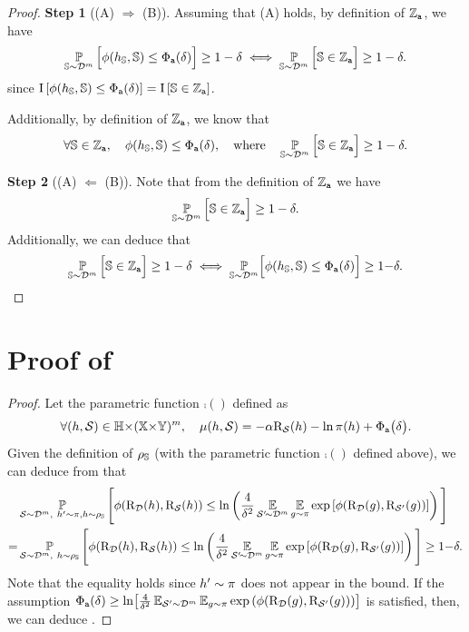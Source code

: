 \begin{noaddcontents}
\begin{proof}
\textbf{Step 1} ((A) $\Rightarrow$ (B)).
Assuming that (A) holds, by definition of $\mathbb{Z}_{{\tt a}}$, we have
\begin{align*}
    \operatorname*{\mathbb{P}}_{\mathbb{S}\sim\mathcal{D}^m}\Big[ \phi(h_{\mathbb{S}}, \mathbb{S}) \le \Phi_{{\tt a}}(\delta) \Big] \ge 1-\delta \iff \operatorname*{\mathbb{P}}_{\mathbb{S}\sim\mathcal{D}^m}\Big[ \mathbb{S}\in\mathbb{Z}_{{\tt a}} \Big] \ge 1-\delta.
\end{align*}
since $\operatorname{I}\left[ \phi(h_{\mathbb{S}}, \mathbb{S}) \le \Phi_{{\tt a}}(\delta) \right] = \operatorname{I}\left[ \mathbb{S}\in\mathbb{Z}_{{\tt a}} \right]$.

Additionally, by definition of $\mathbb{Z}_{{\tt a}}$, we know that
\begin{align*}
    \forall\mathbb{S}\in\mathbb{Z}_{{\tt a}},\quad  \phi(h_{\mathbb{S}}, \mathbb{S}) \le \Phi_{{\tt a}}(\delta), \quad\text{where}\quad \operatorname*{\mathbb{P}}_{\mathbb{S}\sim\mathcal{D}^m}\Big[ \mathbb{S}\in\mathbb{Z}_{{\tt a}} \Big] \ge 1-\delta.
\end{align*}

\textbf{Step 2} ((A) $\Leftarrow$ (B)).
Note that from the definition of $\mathbb{Z}_{{\tt a}}$ we have 
\begin{align*}
\operatorname*{\mathbb{P}}_{\mathbb{S}\sim\mathcal{D}^m}\Big[ \mathbb{S}\in\mathbb{Z}_{{\tt a}} \Big] \ge 1-\delta.
\end{align*}
Additionally, we can deduce that
\begin{align*}
    \operatorname*{\mathbb{P}}_{\mathbb{S}\sim\mathcal{D}^m}\Big[ \mathbb{S}\in\mathbb{Z}_{{\tt a}} \Big] \ge 1-\delta \iff \operatorname*{\mathbb{P}}_{\mathbb{S}\sim\mathcal{D}^m}\!\Big[ \phi(h_{\mathbb{S}}, \mathbb{S}) \le \Phi_{{\tt a}}(\delta) \Big] \ge 1{-}\delta.
\end{align*}
\end{proof}

\section{Proof of }
\label{ap:dis-mu:sec:proof-corollary-algo}

\corollarydisalgo*
\begin{proof}
Let the parametric function $\comp()$ defined as
\begin{align*}
    \forall (h,\mathcal{S})\in\mathbb{H}{\times}(\mathbb{X}{\times}\mathbb{Y})^m,\quad \operatorname{\mu}(h, \mathcal{S}) = -\alpha\text{R}_{\mathcal{S}}(h) -\ln\pi(h) + \Phi_{{\tt a}}\big(\delta\big).
\end{align*}
Given the definition of $\rho_{\mathbb{S}}$ (with the parametric function $\comp()$ defined above), we can deduce from  that
\begin{align*}
    &\operatorname*{\mathbb{P}}_{\mathcal{S}\sim\mathcal{D}^m,\ h'\sim\pi, h\sim\rho_{\mathbb{S}}}\Bigg[ \phi(\text{R}_{\mathcal{D}}(h), \text{R}_{\mathcal{S}}(h)) \le \ln\left( \frac{4}{\delta^2} \operatorname*{\mathbb{E}}_{\mathcal{S}'\!{\sim}\mathcal{D}^m}\operatorname*{\mathbb{E}}_{g{\sim}\pi} \exp\left[\phi(\text{R}_{\mathcal{D}}(g),\text{R}_{\mathcal{S}'}(g))\right]\right) \Bigg]\\
    = &\operatorname*{\mathbb{P}}_{\mathcal{S}\sim\mathcal{D}^m,\ h\sim\rho_{\mathbb{S}}}\Bigg[ \phi(\text{R}_{\mathcal{D}}(h), \text{R}_{\mathcal{S}}(h)) \le \ln\left( \frac{4}{\delta^2} \operatorname*{\mathbb{E}}_{\mathcal{S}'\!{\sim}\mathcal{D}^m}\operatorname*{\mathbb{E}}_{g{\sim}\pi} \exp\left[\phi(\text{R}_{\mathcal{D}}(g),\text{R}_{\mathcal{S}'}(g))\right]\right) \Bigg] \ge 1{-}\delta.
\end{align*}
Note that the equality holds since $h'\sim\pi$ does not appear in the bound. 
If the assumption $\Phi_{{\tt a}}(\delta) \ge \ln\!\left[ \frac{4}{\delta^2} \operatorname*{\mathbb{E}}_{\mathcal{S}'{\sim}\mathcal{D}^m}\operatorname*{\mathbb{E}}_{g{\sim}\pi} \exp\left(\phi(\text{R}_{\mathcal{D}}(g),\text{R}_{\mathcal{S}'}(g))\right)\right]$ is satisfied, then, we can deduce .
\end{proof}


\end{noaddcontents}
